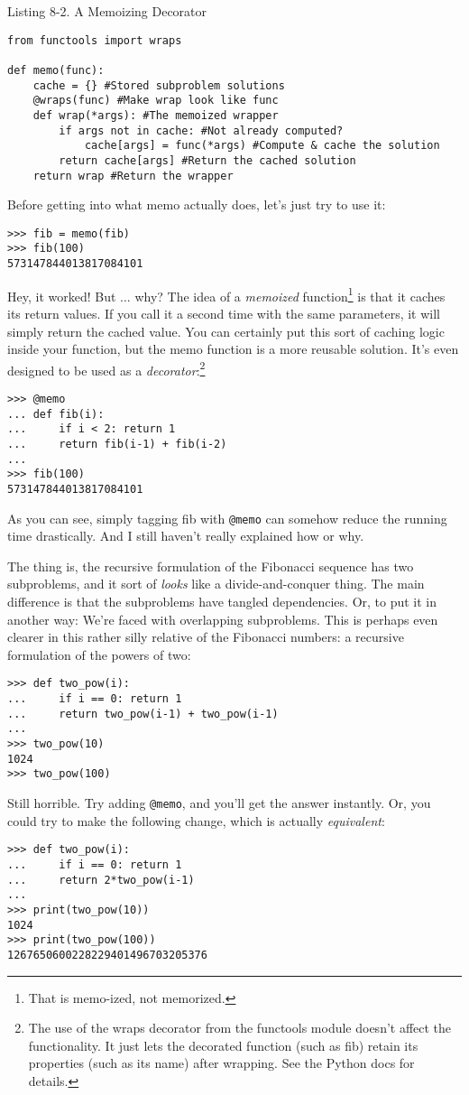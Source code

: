 Listing 8-2. A Memoizing Decorator
\begin{lstlisting}
from functools import wraps

def memo(func):
    cache = {} #Stored subproblem solutions
    @wraps(func) #Make wrap look like func
    def wrap(*args): #The memoized wrapper
        if args not in cache: #Not already computed?
            cache[args] = func(*args) #Compute & cache the solution
        return cache[args] #Return the cached solution
    return wrap #Return the wrapper
\end{lstlisting}

Before getting into what memo actually does, let's just try to use it:
\begin{lstlisting}
>>> fib = memo(fib)
>>> fib(100)
573147844013817084101
\end{lstlisting}
Hey, it worked! But ... why?
The idea of a \textit{memoized} function\footnote{That is memo-ized, not memorized.} is that it caches its return values. If you call it a second time with the same parameters, it will simply return the cached value. You can certainly put this sort of caching logic inside your function, but the memo function is a more reusable solution. It's even designed to be used as a \textit{decorator}:\footnote{The use of the wraps decorator from the functools module doesn’t affect the functionality. It just lets the decorated function (such as fib) retain its properties (such as its name) after wrapping. See the Python docs for details.}

\begin{lstlisting}
>>> @memo
... def fib(i):
...     if i < 2: return 1
...     return fib(i-1) + fib(i-2)
...
>>> fib(100)
573147844013817084101
\end{lstlisting}

As you can see, simply tagging fib with \texttt{@memo} can somehow reduce the running time drastically. And I still haven't really explained how or why.

The thing is, the recursive formulation of the Fibonacci sequence has two subproblems, and it sort
of \textit{looks} like a divide-and-conquer thing. The main difference is that the subproblems have tangled dependencies. Or, to put it in another way: We're faced with overlapping subproblems. This is perhaps even clearer in this rather silly relative of the Fibonacci numbers: a recursive formulation of the powers of two:
\begin{lstlisting}
>>> def two_pow(i):
...     if i == 0: return 1
...     return two_pow(i-1) + two_pow(i-1)
...
>>> two_pow(10)
1024
>>> two_pow(100)
\end{lstlisting}
Still horrible. Try adding \texttt{@memo}, and you'll get the answer instantly. Or, you could try to make the following change, which is actually \textit{equivalent}:
\begin{lstlisting}
>>> def two_pow(i):
...     if i == 0: return 1
...     return 2*two_pow(i-1)
...
>>> print(two_pow(10))
1024
>>> print(two_pow(100))
1267650600228229401496703205376
\end{lstlisting}

